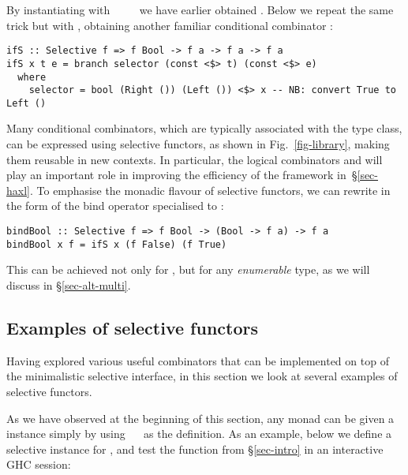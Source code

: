 {By instantiating  with ~\hs{=}~~\hs{=}~\hs{()} we have
earlier obtained . Below we repeat the same trick but with
, obtaining another familiar conditional combinator :

\vspace{1mm}
\begin{verbatim}
ifS :: Selective f => f Bool -> f a -> f a -> f a
ifS x t e = branch selector (const <$> t) (const <$> e)
  where
    selector = bool (Right ()) (Left ()) <$> x -- NB: convert True to Left ()
\end{verbatim}
\vspace{1mm}

\noindent
Many conditional combinators, which are typically associated with the 
type class, can be expressed using selective functors, as shown in
Fig.~\ref{fig-library}, making them reusable in new contexts. In particular, the
logical combinators \hs{<||>} and \hs{<&&>} will play an important role in
improving the efficiency of the \Haxl framework in~\S\ref{sec-haxl}. To
emphasise the monadic flavour of selective functors, we can rewrite  in
the form of the bind operator specialised to :

\vspace{1mm}
\begin{verbatim}
bindBool :: Selective f => f Bool -> (Bool -> f a) -> f a
bindBool x f = ifS x (f False) (f True)
\end{verbatim}
\vspace{1mm}

\noindent
This can be achieved not only for , but for any \emph{enumerable}
type, as we will discuss in \S\ref{sec-alt-multi}.

\subsection{Examples of selective functors}\label{sec-instances}

Having explored various useful combinators that can be implemented on top of the
minimalistic selective interface, in this section we look at several examples of
selective functors.

As we have observed at the beginning of this section, any monad can be given a
 instance simply by using ~\hs{=}~ as the
definition. As an example, below we define a selective instance for , and
test the function  from \S\ref{sec-intro} in an interactive GHC
session:

}
